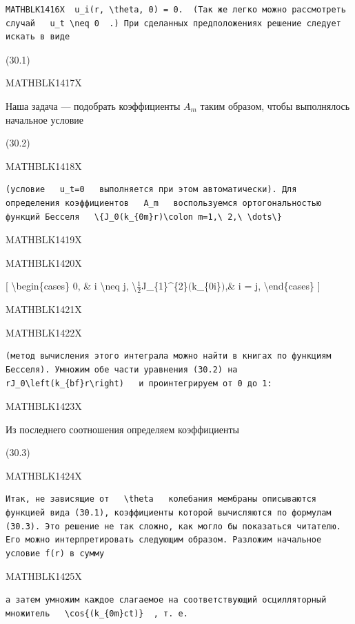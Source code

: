 \documentclass[
]{article}
\begin{document}
{{{\begin{verbatim}
MATHBLK1416X  u_i(r, \theta, 0) = 0.  (Так же легко можно рассмотреть случай   u_t \neq 0  .) При сделанных предположениях решение следует искать в виде
\end{verbatim}

(30.1)

MATHBLK1417X

Наша задача --- подобрать коэффициенты \(A_m\) таким образом, чтобы
выполнялось начальное условие

(30.2)

MATHBLK1418X

\begin{verbatim}
(условие   u_t=0   выполняется при этом автоматически). Для определения коэффициентов   A_m   воспользуемся ортогональностью функций Бесселя   \{J_0(k_{0m}r)\colon m=1,\ 2,\ \dots\} 
\end{verbatim}

MATHBLK1419X

MATHBLK1420X

{[} \textbackslash begin\{cases\} 0, \& i \textbackslash neq j,
\textbackslash{}\(\frac{1}{2}\)J\_\{1\}\^{}\{2\}\((\)k\_\{0i\}\()\),\& i
= j, \textbackslash end\{cases\} {]}

MATHBLK1421X

MATHBLK1422X

\begin{verbatim}
(метод вычисления этого интеграла можно найти в книгах по функциям Бесселя). Умножим обе части уравнения (30.2) на   rJ_0\left(k_{bf}r\right)   и проинтегрируем от 0 до 1:
\end{verbatim}

MATHBLK1423X

Из последнего соотношения определяем коэффициенты

(30.3)

MATHBLK1424X

\begin{verbatim}
Итак, не зависящие от   \theta   колебания мембраны описываются функцией вида (30.1), коэффициенты которой вычисляются по формулам (30.3). Это решение не так сложно, как могло бы показаться читателю. Его можно интерпретировать следующим образом. Разложим начальное условие f(r) в сумму
\end{verbatim}

MATHBLK1425X

\begin{verbatim}
а затем умножим каждое слагаемое на соответствующий осцилляторный множитель   \cos{(k_{0m}ct)}  , т. е.
\end{verbatim}

}}}
\end{document}
